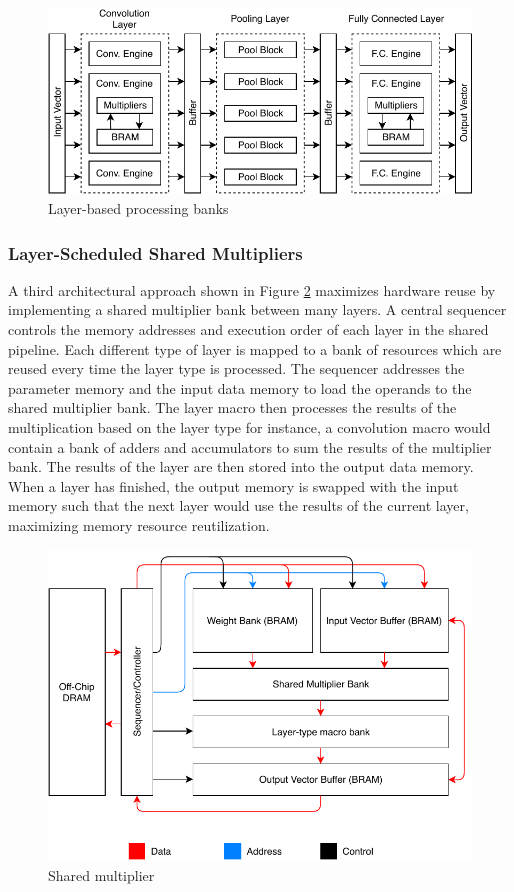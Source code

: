 \documentclass{uw-ece-wkrpt}
\begin{document}
\begin{figure}
    \centering
    \includegraphics{figures/layer-based_processing}
    \caption{Layer-based processing banks}\label{fig:layer-based_processing}
\end{figure}

\subsubsection{Layer-Scheduled Shared Multipliers}

A third architectural approach shown in Figure \ref{fig:shared_multiplier} maximizes hardware reuse by implementing a shared multiplier bank between many layers. A central sequencer controls the memory addresses and execution order of each layer in the shared pipeline. Each different type of layer is mapped to a bank of resources which are reused every time the layer type is processed. The sequencer addresses the parameter memory and the input data memory to load the operands to the shared multiplier bank. The layer macro then processes the results of the multiplication based on the layer type \textemdash{} for instance, a convolution macro would contain a bank of adders and accumulators to sum the results of the multiplier bank. The results of the layer are then stored into the output data memory. When a layer has finished, the output memory is swapped with the input memory such that the next layer would use the results of the current layer, maximizing memory resource reutilization.

\begin{figure}
    \centering
    \includegraphics{figures/shared_multiplier}
    \caption{Shared multiplier \cite{Ma2017An-automatic-RT}}\label{fig:shared_multiplier}
\end{figure}
\end{document}
